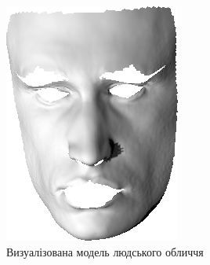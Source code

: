 \begin{figure}[h]
  \centering
  \begin{subfigure}[b]{0.4\textwidth}
    \centering
    \includegraphics[width=\textwidth]{images/statue-orig}
    \caption{Визуалізована модель людського обличчя}
    \label{fig:argmin:statue-original}
  \end{subfigure}
  \begin{subfigure}[b]{0.4\textwidth}
    \centering

\end{subfigure}
\end{figure}
